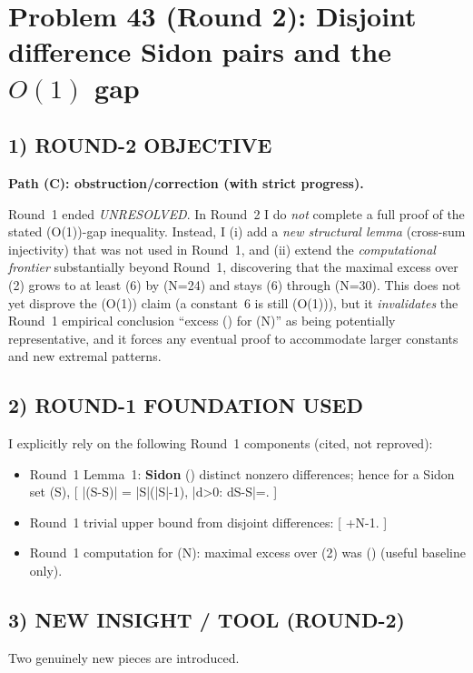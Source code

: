 \section{Problem 43 (Round 2): Disjoint difference Sidon pairs and the \texorpdfstring{$O(1)$}{O(1)} gap}
\label{sec:p43-round2}

\subsection{1) ROUND-2 OBJECTIVE}
\textbf{Path (C): obstruction/correction (with strict progress).}

Round~1 ended \emph{UNRESOLVED}.  In Round~2 I do \emph{not} complete a full proof of the stated (O(1))-gap inequality.  Instead, I (i) add a \emph{new structural lemma} (cross-sum injectivity) that was not used in Round~1, and (ii) extend the \emph{computational frontier} substantially beyond Round~1, discovering that the maximal excess over (2) grows to at least (6) by (N=24) and stays (6) through (N=30).  This does not yet disprove the (O(1)) claim (a constant~6 is still (O(1))), but it \emph{invalidates} the Round~1 empirical conclusion “excess () for (N)” as being potentially representative, and it forces any eventual proof to accommodate larger constants and new extremal patterns.

\subsection{2) ROUND-1 FOUNDATION USED}
I explicitly rely on the following Round~1 components (cited, not reproved):
\begin{itemize}
	\item Round~1 Lemma~1: \textbf{Sidon} (\Rightarrow) distinct nonzero differences; hence for a Sidon set (S\subset [N]),
	[
	|(S-S)| = |S|(|S|-1),\qquad
	|{d>0: d\in S-S}|=.
	]
	\item Round~1 trivial upper bound from disjoint differences:
	[
	+\le N-1.
	]
	\item Round~1 computation for (N): maximal excess over (2) was () (useful baseline only).
\end{itemize}

\subsection{3) NEW INSIGHT / TOOL (ROUND-2)}
Two genuinely new pieces are introduced.

